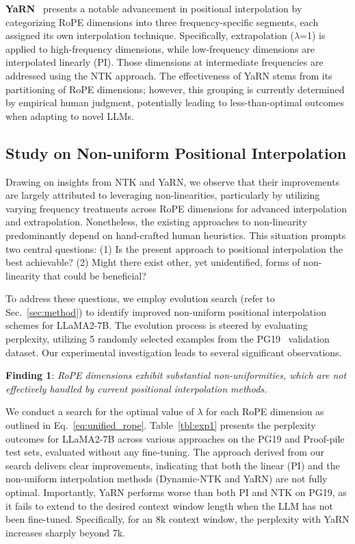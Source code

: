 \textbf{YaRN}~\cite{yarn} presents a notable advancement in positional interpolation by categorizing RoPE dimensions into three frequency-specific segments, each assigned its own interpolation technique. Specifically, extrapolation ($\lambda$=1) is applied to high-frequency dimensions, while low-frequency dimensions are interpolated linearly (PI). Those dimensions at intermediate frequencies are addressed using the NTK approach. The effectiveness of YaRN stems from its partitioning of RoPE dimensions; however, this grouping is currently determined by empirical human judgment, potentially leading to less-than-optimal outcomes when adapting to novel LLMs.

\subsection{Study on Non-uniform Positional Interpolation}

Drawing on insights from NTK and YaRN, we observe that their improvements are largely attributed to leveraging non-linearities, particularly by utilizing varying frequency treatments across RoPE dimensions for advanced interpolation and extrapolation. Nonetheless, the existing approaches to non-linearity predominantly depend on hand-crafted human heuristics. This situation prompts two central questions: (1) Is the present approach to positional interpolation the best achievable? (2) Might there exist other, yet unidentified, forms of non-linearity that could be beneficial?

To address these questions, we employ evolution search (refer to Sec.~\ref{sec:method}) to identify improved non-uniform positional interpolation schemes for LLaMA2-7B. The evolution process is steered by evaluating perplexity, utilizing 5 randomly selected examples from the PG19~\cite{pg19} validation dataset. Our experimental investigation leads to several significant observations.

\textbf{Finding 1}: \textit{RoPE dimensions exhibit substantial non-uniformities, which are not effectively handled by current positional interpolation methods.}

We conduct a search for the optimal value of $\lambda$ for each RoPE dimension as outlined in Eq.~\ref{eq:unified_rope}. Table~\ref{tbl:exp1} presents the perplexity outcomes for LLaMA2-7B across various approaches on the PG19 and Proof-pile~\cite{proof-pile} test sets, evaluated without any fine-tuning. The approach derived from our search delivers clear improvements, indicating that both the linear (PI) and the non-uniform interpolation methods (Dynamic-NTK and YaRN) are not fully optimal. Importantly, YaRN performs worse than both PI and NTK on PG19, as it fails to extend to the desired context window length when the LLM has not been fine-tuned. Specifically, for an 8k context window, the perplexity with YaRN increases sharply beyond 7k.

